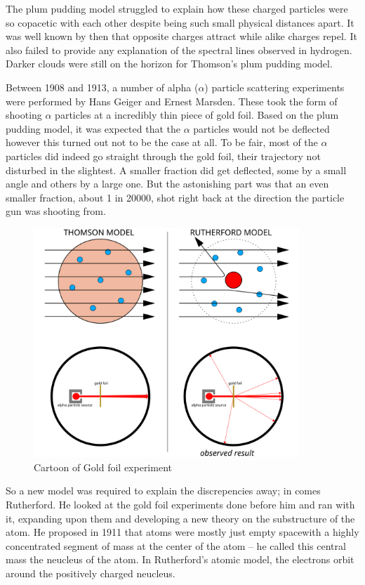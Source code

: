 The plum pudding model struggled to explain how these charged particles were so copacetic with each other despite being such small physical distances apart.
It was well known by then that opposite charges attract while alike charges repel.
It also failed to provide any explanation of the spectral lines observed in hydrogen.
Darker clouds were still on the horizon for Thomson's plum pudding model.

Between 1908 and  1913, a number of alpha ($\alpha$) particle scattering experiments were performed by Hans Geiger and Ernest Marsden.
These took the form of shooting $\alpha$  particles at a  incredibly thin piece of gold foil.
Based on the plum pudding model, it was expected that the $\alpha$ particles would not be deflected however this turned out not to be the case at all.
To be fair, most of the $\alpha$ particles did indeed go straight through the gold foil, their trajectory not disturbed in the slightest.
A smaller fraction did get deflected, some by a small angle and others by a large one.
But the astonishing part was that an even smaller fraction, about 1 in 20000, shot right back at the direction the particle gun was shooting from.

\begin{figure}[H]
  \centering
  \includegraphics[width=100mm]{figures/goldFoil.png}
  \caption{Cartoon of Gold foil experiment}
  \label{goldFoil}
\end{figure}

So a new model was required to explain the discrepencies away; in comes Rutherford.
He looked at the gold foil experiments done before him and ran with it, expanding upon them and developing a new theory on the substructure of the atom.
He proposed in 1911 that atoms were mostly just empty spacewith a highly concentrated segment of mass at the center of the atom -- he called this central mass the neucleus of the atom.
In Rutherford's atomic model, the electrons orbit around the positively charged neucleus.

